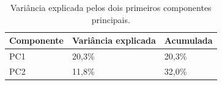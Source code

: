 \begin{table}[htbp]
\caption{Variância explicada pelos dois primeiros componentes principais.}
\label{tab:pca}
\begin{tabular}{lll}
\toprule
Componente & Variância explicada & Acumulada \\
\midrule
PC1 & 20,3\% & 20,3\% \\
PC2 & 11,8\% & 32,0\% \\
\bottomrule
\end{tabular}
\end{table}

